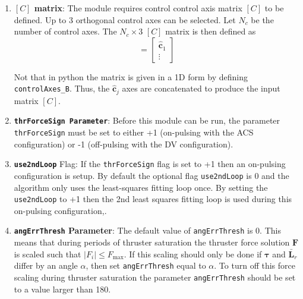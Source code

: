 \begin{enumerate}
\item \textbf{$[C]$ matrix}: The module requires control control axis matrix $[C]$ to be defined.  Up to 3 orthogonal control axes can be selected.  Let $N_{c}$ be the number of control axes.  The $N_{c}\times 3$ $[C]$ matrix is then defined as
\begin{equation}
	[C] = \begin{bmatrix}
		\hat{\bm c}_{1}
		\\
		\vdots
	\end{bmatrix}
\end{equation}

Not that in python the matrix is given in a 1D form by defining {\tt controlAxes\_B}.  Thus, the $\hat{\bm c}_{j}$ axes are concatenated to produce the input matrix $[C]$. 

\item \textbf{\tt thrForceSign Parameter}: Before this module can be run, the parameter {\tt thrForceSign} must be set to either +1 (on-pulsing with the ACS configuration) or -1 (off-pulsing with the DV configuration).

\item \textbf{\tt use2ndLoop} Flag: If the  {\tt thrForceSign} flag is set to +1 then an on-pulsing configuration is setup.  By default the optional flag  {\tt use2ndLoop} is 0 and the algorithm  only uses the least-squares fitting loop once.  By setting the {\tt use2ndLoop} to +1 then the 2nd least squares fitting loop is used during this on-pulsing configuration,. 

\item \textbf{{\tt angErrThresh} Parameter}: The default value of {\tt angErrThresh} is 0\dg.  This means that during periods of thruster saturation the thruster force solution $\bm F$ is scaled such that $|F_{i}| \le F_{\text{max}}$.  If this scaling should only be done if $\bm\tau$ and $\bar{\bm L}_{r}$ differ by an angle $\alpha$, then set {\tt angErrThresh} equal to $\alpha$.  To turn off this force scaling during thruster saturation the parameter   {\tt angErrThresh} should be set to a value larger than 180\dg.  

\end{enumerate}